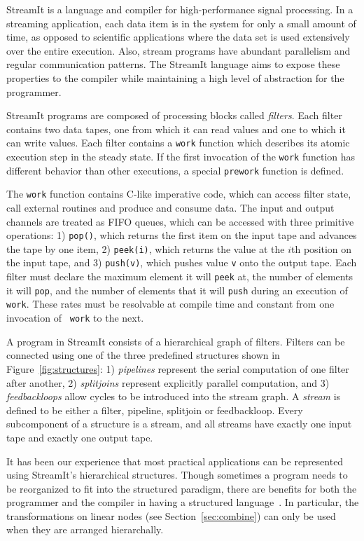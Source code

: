 StreamIt is a language and compiler for high-performance signal
processing.
In a streaming application, each data item is in the system for only a
small amount of time, as opposed to scientific applications where the
data set is used extensively over the entire execution.  Also, stream
programs have abundant parallelism and regular communication patterns.
The StreamIt language aims to expose these properties to the compiler
while maintaining a high level of abstraction for the programmer.

StreamIt programs are composed of processing blocks called {\it
filters}. Each filter contains two data tapes, one from which it can read values
and one to which it can write values. Each filter contains
a {\tt work} function which describes its atomic execution step in the
steady state. If the first invocation of the {\tt work} function has
different behavior than other executions, a special {\tt prework} 
function is defined.

The {\tt work} function contains C-like imperative
code, which can access filter state, call external routines and
produce and consume data.  The input and output channels are treated
as FIFO queues, which can be accessed with three primitive operations:
1) {\tt pop()}, which returns the first item on the input tape and
advances the tape by one item, 2) {\tt peek(i)}, which returns the
value at the $i$th position on the input tape, and 3) {\tt push(v)},
which pushes value {\tt v} onto the output tape.  Each filter
must declare the maximum element it will {\tt peek} at, the number of
elements it will {\tt pop}, and the number of elements that it will
{\tt push} during an execution of {\tt work}.  These rates must be
resolvable at compile time and constant from one invocation of {\tt
work} to the next. 

A program in StreamIt consists of a hierarchical graph of 
filters.  Filters can be connected using one of the three predefined
structures shown in Figure~\ref{fig:structures}: 1) {\it pipelines}
represent the serial computation of one filter after another, 2) {\it
splitjoins} represent explicitly parallel computation, and 3) {\it
feedbackloops} allow cycles to be introduced into the stream graph.
A {\it stream} is defined to be either a filter, pipeline, 
splitjoin or feedbackloop. Every subcomponent of a structure 
is a stream, and all streams have exactly one input tape and 
exactly one output tape.

It has been our experience that most practical applications can be
represented using StreamIt's hierarchical structures.  Though
sometimes a program needs to be reorganized to fit into the structured
paradigm, there are benefits for both the programmer and the compiler
in having a structured language~\cite{streamitcc}.  In particular,
the transformations on linear nodes (see Section~\ref{sec:combine})
can only be used when they are arranged hierarchally.
